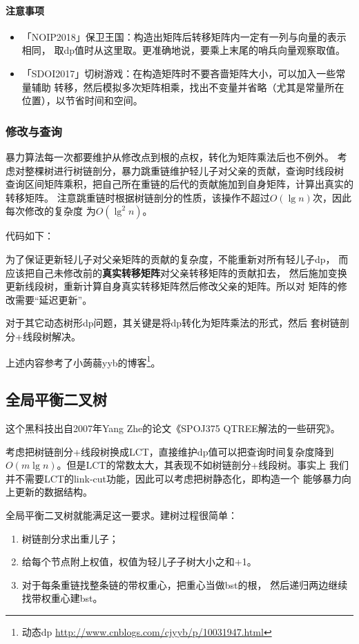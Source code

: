 \paragraph{注意事项}
\begin{itemize}
    \item 「NOIP2018」保卫王国：构造出矩阵后转移矩阵内一定有一列与向量的表示相同，
    取dp值时从这里取。更准确地说，要乘上末尾的哨兵向量观察取值。
    \item 「SDOI2017」切树游戏：在构造矩阵时不要吝啬矩阵大小，可以加入一些常量辅助
    转移，然后模拟多次矩阵相乘，找出不变量并省略（尤其是常量所在位置），以节省时间和空间。
\end{itemize}

\subsubsection{修改与查询}
暴力算法每一次都要维护从修改点到根的点权，转化为矩阵乘法后也不例外。
考虑对整棵树进行树链剖分，暴力跳重链维护轻儿子对父亲的贡献，查询时线段树
查询区间矩阵乘积，把自己所在重链的后代的贡献施加到自身矩阵，计算出真实的转移矩阵。
注意跳重链时根据树链剖分的性质，该操作不超过$O(\lg n)$次，因此每次修改的复杂度
为$O(\lg^2 n)$。

代码如下：


为了保证更新轻儿子对父亲矩阵的贡献的复杂度，不能重新对所有轻儿子dp，
而应该把自己未修改前的{\bfseries 真实转移矩阵}对父亲转移矩阵的贡献扣去，
然后施加变换更新线段树，重新计算自身真实转移矩阵然后修改父亲的矩阵。所以对
矩阵的修改需要``延迟更新''。

对于其它动态树形dp问题，其关键是将dp转化为矩阵乘法的形式，然后
套树链剖分+线段树解决。

上述内容参考了小蒟蒻yyb的博客\footnote{
    动态dp
    \url{http://www.cnblogs.com/cjyyb/p/10031947.html}
}。
\subsection{全局平衡二叉树}
这个黑科技出自2007年Yang Zhe的论文《SPOJ375 QTREE解法的一些研究》\cite{GBT}。

考虑把树链剖分+线段树换成LCT，直接维护dp值可以把查询时间复杂度降到
$O(m\lg n)$。但是LCT的常数太大，其表现不如树链剖分+线段树。事实上
我们并不需要LCT的link-cut功能，因此可以考虑把树静态化，即构造一个
能够暴力向上更新的数据结构。

全局平衡二叉树就能满足这一要求。建树过程很简单：
\begin{enumerate}
    \item 树链剖分求出重儿子；
    \item 给每个节点附上权值，权值为轻儿子子树大小之和+1。
    \item 对于每条重链找整条链的带权重心，把重心当做bst的根，
    然后递归两边继续找带权重心建bst。
\end{enumerate}

